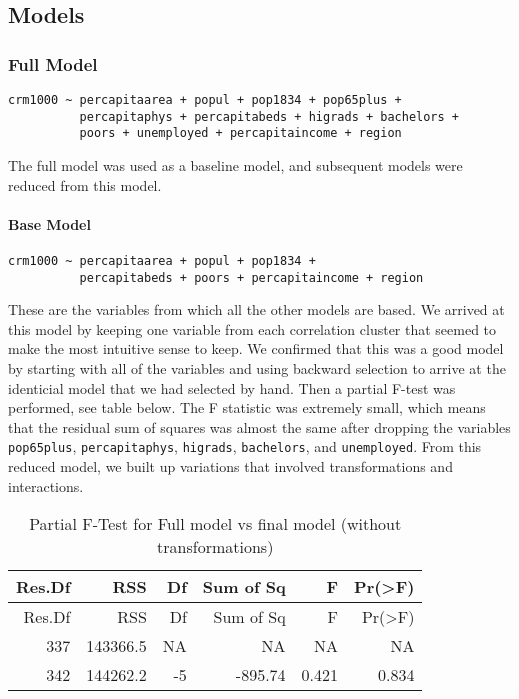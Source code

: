 \documentclass[]{article}
\let\oldparagraph\paragraph
\renewcommand{\paragraph}[1]{\oldparagraph{#1}\mbox{}}
\begin{document}
\subsection{Models}\label{models}

\subsubsection{Full Model}\label{full-model}

\begin{verbatim}
crm1000 ~ percapitaarea + popul + pop1834 + pop65plus +
          percapitaphys + percapitabeds + higrads + bachelors +
          poors + unemployed + percapitaincome + region
\end{verbatim}

The full model was used as a baseline model, and subsequent models were
reduced from this model.

\paragraph{Base Model}\label{base-model}

\begin{verbatim}
crm1000 ~ percapitaarea + popul + pop1834 +
          percapitabeds + poors + percapitaincome + region
\end{verbatim}

These are the variables from which all the other models are based. We
arrived at this model by keeping one variable from each correlation
cluster that seemed to make the most intuitive sense to keep. We
confirmed that this was a good model by starting with all of the
variables and using backward selection to arrive at the identicial model
that we had selected by hand. Then a partial F-test was performed, see
table below. The F statistic was extremely small, which means that the
residual sum of squares was almost the same after dropping the variables
\texttt{pop65plus}, \texttt{percapitaphys}, \texttt{higrads},
\texttt{bachelors}, and \texttt{unemployed}. From this reduced model, we
built up variations that involved transformations and interactions.

\begin{longtable}[]{@{}rrrrrr@{}}
\caption{Partial F-Test for Full model vs final model (without
transformations)}\tabularnewline
\toprule
Res.Df & RSS & Df & Sum of Sq & F & Pr(\textgreater{}F)\tabularnewline
\midrule
\endfirsthead
\toprule
Res.Df & RSS & Df & Sum of Sq & F & Pr(\textgreater{}F)\tabularnewline
\midrule
\endhead
337 & 143366.5 & NA & NA & NA & NA\tabularnewline
342 & 144262.2 & -5 & -895.74 & 0.421 & 0.834\tabularnewline
\bottomrule
\end{longtable}
\end{document}
